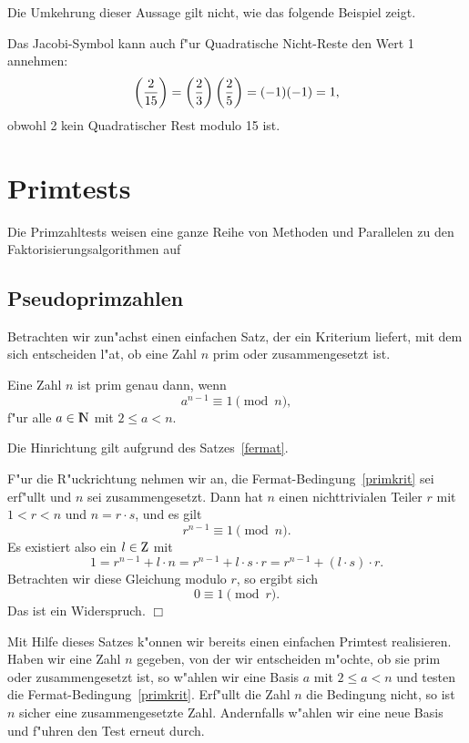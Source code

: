 Die Umkehrung dieser Aussage gilt nicht, wie das folgende Beispiel zeigt.

\begin{beispiel}
  Das Jacobi-Symbol kann auch f"ur Quadratische Nicht-Reste den Wert 1 annehmen:
  $$ \left(\frac{2}{15}\right) = \left(\frac{2}{3}\right)\left(\frac{2}{5}\right) = (-1)(-1)=1, $$
  obwohl 2 kein Quadratischer Rest modulo 15 ist.
\end{beispiel}    

\section{Primtests}

Die Primzahltests weisen eine ganze Reihe von Methoden und Parallelen
zu den Faktorisierungsalgorithmen auf

\subsection{Pseudoprimzahlen}

Betrachten wir zun"achst einen einfachen Satz, der ein Kriterium
liefert, mit dem sich entscheiden l"a\3t, ob eine Zahl $n$ prim oder
zusammengesetzt ist.

\begin{satz}
   Eine Zahl $n$ ist prim genau dann, wenn
   \begin{equation} 
     a^{n-1} \equiv 1 \pmod{n}, \label{primkrit} 
   \end{equation}
   f"ur alle $a\in\N$ mit $2 \le a < n$.
\end{satz}

\beweis 
Die Hinrichtung gilt aufgrund des Satzes~\ref{fermat}.

F"ur die R"uckrichtung nehmen wir an, die
Fermat-Bedingung~\ref{primkrit} sei erf"ullt und $n$ sei
zusammengesetzt. Dann hat $n$ einen nichttrivialen Teiler $r$ mit $1 <
r < n$ und $n=r\cdot s$, und es gilt
$$ r^{n-1} \equiv 1 \pmod{n}. $$
Es existiert also ein $l\in\Z$ mit
$$ 1=r^{n-1}+l\cdot n = r^{n-1}+l\cdot s\cdot r = r^{n-1} + (l\cdot s) \cdot r. $$
Betrachten wir diese Gleichung modulo $r$, so ergibt sich 
$$ 0 \equiv 1 \pmod{r}. $$ 
Das ist ein Widerspruch. \hfill $\Box$

Mit Hilfe dieses Satzes k"onnen wir bereits einen einfachen Primtest realisieren.
Haben wir eine Zahl $n$ gegeben, von der wir entscheiden m"ochte, ob sie prim
oder zusammengesetzt ist, so w"ahlen wir eine Basis $a$ mit
$2\le a < n$ und testen die Fermat-Bedingung~\ref{primkrit}.
Erf"ullt die Zahl $n$ die Bedingung nicht, so ist $n$ sicher
eine zusammengesetzte Zahl. Andernfalls w"ahlen wir eine neue Basis
und f"uhren den Test erneut durch.

